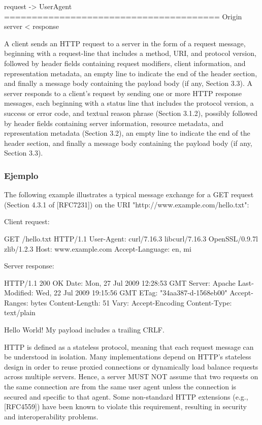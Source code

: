          request   ->
    UserAgent ======================================= Origin server
                                <   response

A client sends an HTTP request to a server in the form of a request
message, beginning with a request-line that includes a method, URI,
and protocol version, followed by header fields
containing request modifiers, client information, and representation
metadata, an empty line to indicate the end of the
header section, and finally a message body containing the payload
body (if any, Section 3.3).
A server responds to a client's request by sending one or more HTTP
   response messages, each beginning with a status line that includes
   the protocol version, a success or error code, and textual reason
   phrase (Section 3.1.2), possibly followed by header fields containing
   server information, resource metadata, and representation metadata
   (Section 3.2), an empty line to indicate the end of the header
   section, and finally a message body containing the payload body (if
   any, Section 3.3).
\subsubsection{Ejemplo}
The following example illustrates a typical message exchange for a
GET request (Section 4.3.1 of [RFC7231]) on the URI
"http://www.example.com/hello.txt":

Client request:

  GET /hello.txt HTTP/1.1
  User-Agent: curl/7.16.3 libcurl/7.16.3 OpenSSL/0.9.7l zlib/1.2.3
  Host: www.example.com
  Accept-Language: en, mi


Server response:

  HTTP/1.1 200 OK
  Date: Mon, 27 Jul 2009 12:28:53 GMT
  Server: Apache
  Last-Modified: Wed, 22 Jul 2009 19:15:56 GMT
  ETag: "34aa387-d-1568eb00"
  Accept-Ranges: bytes
  Content-Length: 51
  Vary: Accept-Encoding
  Content-Type: text/plain

  Hello World! My payload includes a trailing CRLF.

  HTTP is defined as a stateless protocol, meaning that each request
   message can be understood in isolation.  Many implementations depend
   on HTTP's stateless design in order to reuse proxied connections or
   dynamically load balance requests across multiple servers.  Hence, a
   server MUST NOT assume that two requests on the same connection are
   from the same user agent unless the connection is secured and
   specific to that agent.  Some non-standard HTTP extensions (e.g.,
   [RFC4559]) have been known to violate this requirement, resulting in
   security and interoperability problems.

